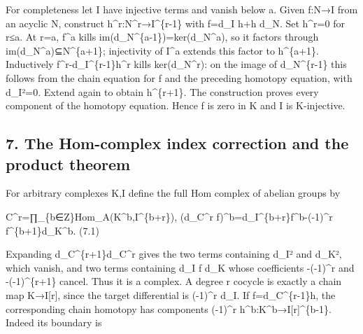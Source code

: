 \documentclass[11pt]{article}
\begin{document}
For completeness let I have injective terms and vanish below a. Given f:\allowbreak{}N\allowbreak{}→I from an acyclic N,\allowbreak{} construct h\textasciicircum{}r:\allowbreak{}N\textasciicircum{}r\allowbreak{}→I\textasciicircum{}\{r-1\} with f\allowbreak{}=d\_\allowbreak{}I h\allowbreak{}+h d\_\allowbreak{}N. Set h\textasciicircum{}r\allowbreak{}=0 for r≤a. At r\allowbreak{}=a,\allowbreak{} f\^{}a kills im(d\_\allowbreak{}N\textasciicircum{}\{a-1\})\allowbreak{}\allowbreak{}=ker(d\_\allowbreak{}N\textasciicircum{}a)\allowbreak{},\allowbreak{} so it factors through im(d\_\allowbreak{}N\textasciicircum{}a)\allowbreak{}⊆N\textasciicircum{}\{a\allowbreak{}+1\}; injectivity of I\^{}a extends this factor to h\textasciicircum{}\{a\allowbreak{}+1\}. Inductively f\textasciicircum{}r-d\_\allowbreak{}I\textasciicircum{}\{r-1\}h\textasciicircum{}r kills ker(d\_\allowbreak{}N\textasciicircum{}r)\allowbreak{}:\allowbreak{} on the image of d\_\allowbreak{}N\textasciicircum{}\{r-1\} this follows from the chain equation for f and the preceding homotopy equation,\allowbreak{} with d\_\allowbreak{}I²\allowbreak{}=0. Extend again to obtain h\textasciicircum{}\{r\allowbreak{}+1\}. The construction proves every component of the homotopy equation. Hence f is zero in K and I is K-injective.

\subsection{7. The Hom-complex index correction and the product theorem}\label{proofs-9206-9744-the-hom-complex-index-correction-and-the-product-theorem}

For arbitrary complexes K,\allowbreak{}I define the full Hom complex of abelian groups by

C\textasciicircum{}r\allowbreak{}=∏\_\allowbreak{}\{b\allowbreak{}∈Z\}Hom\_\allowbreak{}A(K\textasciicircum{}b,\allowbreak{}I\textasciicircum{}\{b\allowbreak{}+r\})\allowbreak{},\allowbreak{} (d\_\allowbreak{}C\textasciicircum{}r f)\allowbreak{}\textasciicircum{}b\allowbreak{}=d\_\allowbreak{}I\textasciicircum{}\{b\allowbreak{}+r\}f\textasciicircum{}b-(-1)\allowbreak{}\textasciicircum{}r f\textasciicircum{}\{b\allowbreak{}+1\}d\_\allowbreak{}K\textasciicircum{}b. (7.1)\allowbreak{}

Expanding d\_\allowbreak{}C\textasciicircum{}\{r\allowbreak{}+1\}d\_\allowbreak{}C\textasciicircum{}r gives the two terms containing d\_\allowbreak{}I² and d\_\allowbreak{}K²,\allowbreak{} which vanish,\allowbreak{} and two terms containing d\_\allowbreak{}I f d\_\allowbreak{}K whose coefficients -(-1)\allowbreak{}\textasciicircum{}r and -(-1)\allowbreak{}\textasciicircum{}\{r\allowbreak{}+1\} cancel. Thus it is a complex. A degree r cocycle is exactly a chain map K\allowbreak{}→I[r]\allowbreak{},\allowbreak{} since the target differential is (-1)\allowbreak{}\textasciicircum{}r d\_\allowbreak{}I. If f\allowbreak{}=d\_\allowbreak{}C\textasciicircum{}\{r-1\}h,\allowbreak{} the corresponding chain homotopy has components (-1)\allowbreak{}\textasciicircum{}r h\textasciicircum{}b:\allowbreak{}K\textasciicircum{}b\allowbreak{}→I[r]\allowbreak{}\textasciicircum{}\{b-1\}. Indeed its boundary is
\end{document}
